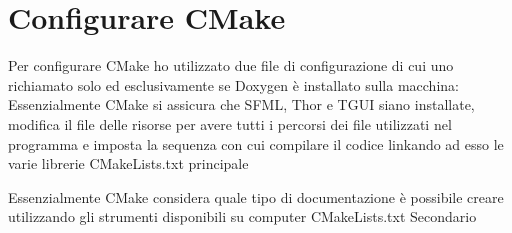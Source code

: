 \section{Configurare CMake}
Per configurare CMake ho utilizzato due file di configurazione di cui uno richiamato solo ed esclusivamente se Doxygen è installato sulla macchina:
Essenzialmente CMake si assicura che SFML, Thor e TGUI siano installate, modifica il file delle risorse per avere tutti i percorsi dei file utilizzati nel programma e imposta la sequenza con cui compilare il codice linkando ad esso le varie librerie
CMakeLists.txt principale

Essenzialmente CMake considera quale tipo di documentazione è possibile creare utilizzando gli strumenti disponibili su computer
CMakeLists.txt Secondario
